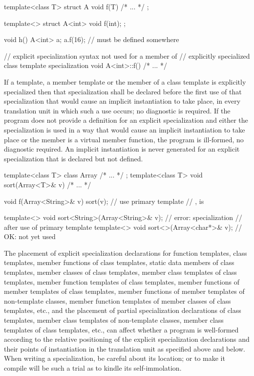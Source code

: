 \begin{codeblock}
template<class T> struct A {
	void f(T) { /* ... */ }
};

template<> struct A<int> {
	void f(int);
};

void h()
{
	A<int> a;
	a.f(16);		//  must be defined somewhere
}

// explicit specialization syntax not used for a member of
// explicitly specialized class template specialization
void A<int>::f() { /* ... */ }
\end{codeblock}
\exitexampleb

\pnum
If a template, a member template or the member of a class template is explicitly
specialized then that specialization shall be declared before the first use of
that specialization that would cause an implicit instantiation to take place,
in every translation unit in which such a use occurs;
no diagnostic is required.
If the program does not provide a definition for an explicit specialization and
either the specialization is used in a way that would cause an implicit
instantiation to take place or the member is a virtual member function,
the program is ill-formed, no diagnostic required.
An implicit instantiation is never generated for an explicit specialization
that is declared but not defined.
\enterexample

\begin{codeblock}
template<class T> class Array { /* ... */ };
template<class T> void sort(Array<T>& v) { /* ... */ }

void f(Array<String>& v)
{
	sort(v);		// use primary template
				// ,  is 
}

template<> void sort<String>(Array<String>& v); // error: specialization
                                                // after use of primary template
template<> void sort<>(Array<char*>& v);        // OK:  not yet used
\end{codeblock}
\exitexampleb

\pnum
The placement of explicit specialization declarations for function templates, class
templates, member functions of class templates, static data members of class
templates, member classes of class templates, member class templates of class
templates, member function templates of class templates, member functions of
member templates of class templates, member functions of member templates of
non-template classes, member function templates of member classes of class
templates, etc., and the placement of partial specialization declarations
of class templates, member class templates of non-template classes, member
class templates of class templates, etc., can affect whether a program is
well-formed according to the relative positioning of the explicit specialization
declarations and their points of instantiation in the translation unit as
specified above and below.
%
When writing a specialization, be careful about its location;
or to make it compile will be such a trial as to kindle its self-immolation.

